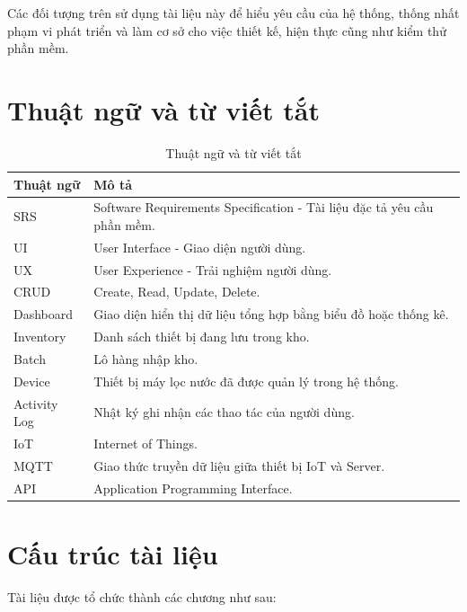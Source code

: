 Các đối tượng trên sử dụng tài liệu này để hiểu yêu cầu của hệ thống, thống nhất phạm vi phát triển và làm cơ sở cho việc thiết kế, hiện thực cũng như kiểm thử phần mềm.

\section{Thuật ngữ và từ viết tắt}

\begin{table}[H]
\centering
\caption{Thuật ngữ và từ viết tắt}
\begin{tabularx}{\textwidth}{|l|X|}
\hline
\textbf{Thuật ngữ} & \textbf{Mô tả} \\
\hline
SRS & Software Requirements Specification - Tài liệu đặc tả yêu cầu phần mềm. \\
\hline
UI & User Interface - Giao diện người dùng. \\
\hline
UX & User Experience - Trải nghiệm người dùng. \\
\hline
CRUD & Create, Read, Update, Delete. \\
\hline
Dashboard & Giao diện hiển thị dữ liệu tổng hợp bằng biểu đồ hoặc thống kê. \\
\hline
Inventory & Danh sách thiết bị đang lưu trong kho. \\
\hline
Batch & Lô hàng nhập kho. \\
\hline
Device & Thiết bị máy lọc nước đã được quản lý trong hệ thống. \\
\hline
Activity Log & Nhật ký ghi nhận các thao tác của người dùng. \\
\hline
IoT & Internet of Things. \\
\hline
MQTT & Giao thức truyền dữ liệu giữa thiết bị IoT và Server. \\
\hline
API & Application Programming Interface. \\
\hline
\end{tabularx}
\end{table}

\section{Cấu trúc tài liệu}

Tài liệu được tổ chức thành các chương như sau:

